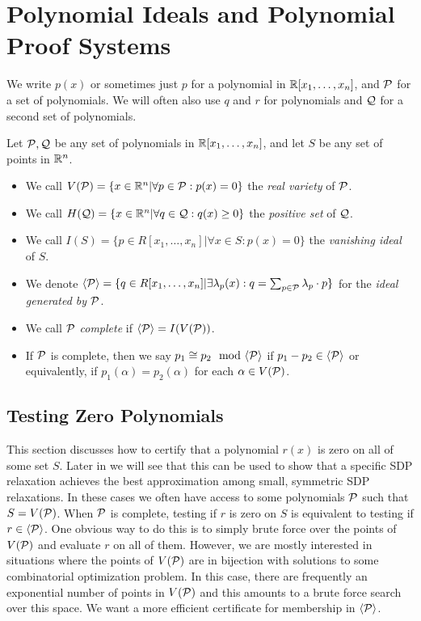 \section{Polynomial Ideals and Polynomial Proof Systems}\label{sec:polyproofs}
We write $p(x)$ or sometimes just $p$ for a polynomial in $\mathbb R[x_1,\dots,x_n]$, and $\mathcal P$ for a set of polynomials.
We will often also use $q$ and $r$ for polynomials and $\mathcal Q$ for a second set of polynomials. 
\begin{definition}
Let $\mathcal P,\mathcal Q$ be any set of polynomials in $\mathbb R[x_1,\dots,x_n]$, and let $S$ be any set of points in $\mathbb R^n$.
\begin{itemize}
\item We call $V(\mathcal P) = \{x \in \mathbb R^n | \forall p \in \mathcal P: p(x) = 0\}$ the \emph{real variety} of $\mathcal P$. 
\item We call $H(\mathcal Q) = \{x \in \mathbb R^n | \forall q \in \mathcal Q: q(x) \geq 0\}$ the \emph{positive set} of $\mathcal Q$.
\item We call $I(S) = \{p \in R[x_1,\dots,x_n] | \forall x \in S: p(x) = 0\}$ the \emph{vanishing ideal} of $S$.
\item We denote $\langle \mathcal P \rangle = \{q \in R[x_1,\dots,x_n] | \exists \lambda_p(x): q = \sum_{p \in \mathcal P} \lambda_p \cdot p\}$ for the \emph{ideal generated by $\mathcal P$}.
\item We call $\mathcal P$ \emph{complete} if $\langle \mathcal P \rangle = I(V(\mathcal P))$.
\item If $\mathcal P$ is complete, then we say $p_1 \cong p_2 \mod \gen{\cP}$ if $p_1 - p_2 \in \langle \mathcal P \rangle$ or equivalently, if $p_1(\alpha) = p_2(\alpha)$ for each $\alpha \in V(\mathcal P)$.
\end{itemize}
\end{definition}

\subsection{Testing Zero Polynomials}

This section discusses how to certify that a polynomial $r(x)$ is zero on all of some set $S$. Later in  we will see that this can be used to show that a specific SDP relaxation achieves the best approximation among small, symmetric SDP relaxations. 
In these cases we often have access to some polynomials $\mathcal P$ such that $S = V(\mathcal P)$.
When $\mathcal P$ is complete, testing if $r$ is zero on $S$ is equivalent to testing if $r \in \langle \mathcal P \rangle$.
One obvious way to do this is to simply brute force over the points of $V(\mathcal P)$ and evaluate $r$ on all of them. 
However, we are mostly interested in situations where the points of $V(\mathcal P)$ are in bijection with solutions to some combinatorial optimization problem.
In this case, there are frequently an exponential number of points in $V(\mathcal P)$ and this amounts to a brute force search over this space. 
We want a more efficient certificate for membership in $\langle \mathcal P \rangle$. 

